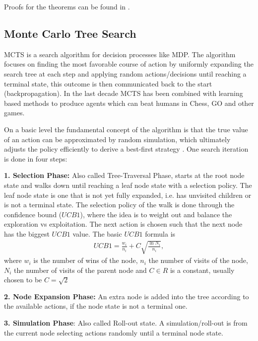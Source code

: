 Proofs for the theorems can be found in \cite[Chapter~17]{ml_foundations}.
\subsection{Monte Carlo Tree Search}
MCTS is a search algorithm for decision processes like MDP. The algorithm
focuses on finding the most favorable course of action by uniformly expanding
the search tree at each step and applying random actions/decisions until
reaching a terminal state, this outcome is then communicated back to the
start (backpropagation). In the last decade MCTS has been combined
with learning based methods \cite{alphazero} to produce agents which can beat
humans in Chess, GO and other games.
\newline

On a basic level the fundamental concept of the algorithm is that the true
value of an action can be approximated by random simulation, which ultimately
adjusts the policy efficiently to derive a best-first strategy
\cite{mcts_survey}. One search iteration is done in four steps:
\newline

\textbf{1. Selection Phase:} Also called Tree-Traversal Phase, starts at the
root node state and walks down until reaching a leaf node state with a
selection policy. The leaf node state is one that is not yet fully expanded,
i.e. has unvisited children or is not a terminal state. The selection policy of
the walk is done through the confidence bound ($UCB1$), where the idea
is to weight out and balance the exploration vs exploitation. The next action
is chosen such that the next node has the biggest $UCB1$ value. The basic
$UCB1$ formula is
\begin{align}
    UCB1 = \frac{w_i}{n_i} + C \sqrt{\frac{\ln N_i}{n_i}},
\end{align}
where $w_i$ is the number of wins of the node, $n_i$ the number of visits of
the node, $N_i$ the number of visits of the parent node and $C\in R$ is a
constant, usually chosen to be $C = \sqrt{2}$
\newline

\textbf{2. Node Expansion Phase:} An extra node is added into the tree according
to the available actions, if the node state is not a terminal one.
\newline

\textbf{3. Simulation Phase}: Also called Roll-out state. A simulation/roll-out
is from the current node selecting actions randomly until a terminal node
state.
\newline

